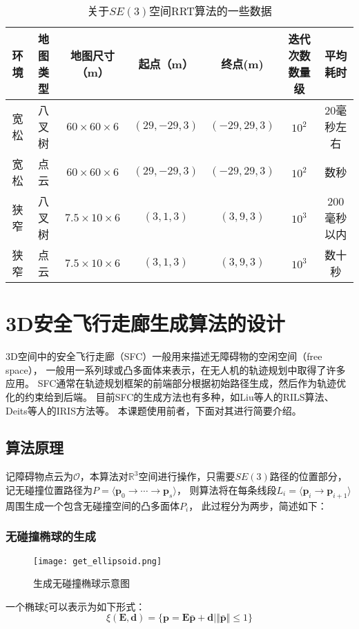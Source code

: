 \begin{table}[htbp]
  \caption{关于$SE(3)$空间RRT算法的一些数据\label{tab:rrtse3_performance_data}}
  \vspace{0.5em}\centering\wuhao
  \begin{tabular}{ccccccc}
  \toprule[1.5pt]
  环境 & 地图类型 & 地图尺寸（m） & 起点（m） & 终点(m) & 迭代次数数量级 & 平均耗时\\
  \midrule[0.2pt]
  宽松 & 八叉树 & $60\times60\times6$ & $(29, -29, 3)$ & $(-29, 29, 3)$ & $10^2$ & 20毫秒左右\\
  宽松 & 点云 & $60\times60\times6$ & $(29, -29, 3)$ & $(-29, 29, 3)$ & $10^2$ & 数秒\\
  狭窄 & 八叉树 & $7.5\times10\times6$  & $(3, 1, 3)$ & $(3, 9, 3)$ & $10^3$ & 200毫秒以内\\
  狭窄 & 点云 & $7.5\times10\times6$  & $(3, 1, 3)$ & $(3, 9, 3)$ & $10^3$ & 数十秒\\
  \bottomrule[1.5pt]
  \end{tabular}
\end{table}

\section{3D安全飞行走廊生成算法的设计}\label{sec:sfc_gen_algorithm}
3D空间中的安全飞行走廊（SFC）一般用来描述无障碍物的空闲空间（free space），
一般用一系列球或凸多面体来表示，在无人机的轨迹规划中取得了许多应用\cite{han2021fast,mohta2018fast,gao2019flying}。
SFC通常在轨迹规划框架的前端部分根据初始路径生成，然后作为轨迹优化的约束给到后端。
目前SFC的生成方法也有多种，如Liu等人的RILS算法\cite{2017Planning}、Deits等人的IRIS方法\cite{deits2015computing}等。
本课题使用前者，下面对其进行简要介绍。
\subsection{算法原理}\label{subsec:design_of_sfc_gen_algorithm}
记障碍物点云为$\mathcal{O}$，本算法对$\mathbb{R}^3$空间进行操作，只需要$SE(3)$路径的位置部分，
记无碰撞位置路径为$P = \langle \bm{p}_0 \rightarrow \cdots \rightarrow \bm{p}_s \rangle$，
则算法将在每条线段$L_i = \langle \bm{p}_i \rightarrow \bm{p}_{i+1} \rangle$周围生成一个包含无碰撞空间的凸多面体$P_i$，
此过程分为两步，简述如下：
\subsubsection{无碰撞椭球的生成}
\begin{figure}[ht]
  \centering
  \texttt{[image: get\_ellipsoid.png]}
  \caption{生成无碰撞椭球示意图}
  \label{fig:get_ellipsoid}
\end{figure}
一个椭球$\xi$可以表示为如下形式：
\begin{equation}
  \xi(\bm{E}, \bm{d}) = \{\bm{p} = \bm{E}\bar{\bm{p}} + \bm{d} \mid \Vert \bar{\bm{p}} \Vert \leq 1 \}
  \label{equ:representation_of_ellipsoids}
\end{equation}

